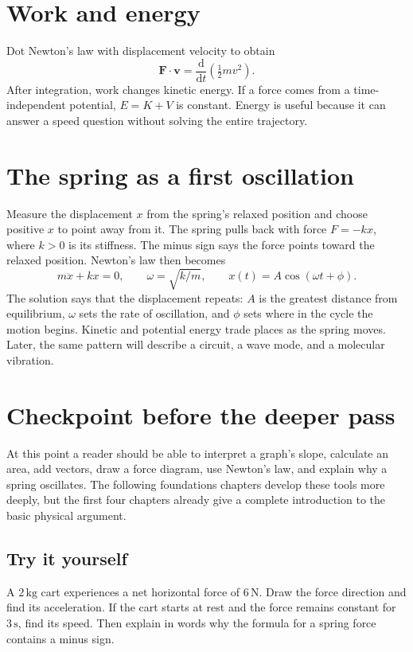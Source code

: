 \documentclass[11pt,oneside]{book}
\newcommand{\dd}{\mathrm{d}}
\newcommand{\vect}[1]{\boldsymbol{#1}}
\newcommand{\od}[2]{\frac{\dd #1}{\dd #2}}
\theoremstyle{reviewstyle}
\newcommand{\learningcheck}[1]{\subsection*{Try it yourself}\noindent #1\par}
\begin{document}
\section{Work and energy}
Dot Newton's law with displacement velocity to obtain
\begin{equation}
\vect F\cdot\vect v=\od{}{t}\left(\tfrac12mv^2\right).
\end{equation}
After integration, work changes kinetic energy. If a force comes from a time-independent potential, $E=K+V$ is constant. Energy is useful because it can answer a speed question without solving the entire trajectory.

\section{The spring as a first oscillation}
Measure the displacement $x$ from the spring's relaxed position and choose positive $x$ to point away from it. The spring pulls back with force $F=-kx$, where $k>0$ is its stiffness. The minus sign says the force points toward the relaxed position. Newton's law then becomes
\begin{equation}
m\ddot x+kx=0,
\qquad \omega=\sqrt{k/m},
\qquad x(t)=A\cos(\omega t+\phi).
\end{equation}
The solution says that the displacement repeats: $A$ is the greatest distance from equilibrium, $\omega$ sets the rate of oscillation, and $\phi$ sets where in the cycle the motion begins. Kinetic and potential energy trade places as the spring moves. Later, the same pattern will describe a circuit, a wave mode, and a molecular vibration.

\section{Checkpoint before the deeper pass}
At this point a reader should be able to interpret a graph's slope, calculate an area, add vectors, draw a force diagram, use Newton's law, and explain why a spring oscillates. The following foundations chapters develop these tools more deeply, but the first four chapters already give a complete introduction to the basic physical argument.

\learningcheck{A $2\,\mathrm{kg}$ cart experiences a net horizontal force of $6\,\mathrm N$. Draw the force direction and find its acceleration. If the cart starts at rest and the force remains constant for $3\,\mathrm s$, find its speed. Then explain in words why the formula for a spring force contains a minus sign.}
\end{document}
